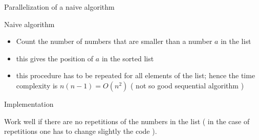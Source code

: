 \documentclass[compress,10pt,aspectratio=169]{beamer}
\begin{document}
\begin{frame}[fragile]{Parallelization of a naive algorithm}
  \scriptsize
  \begin{block}{Naive algorithm}
  \begin{itemize}
  \item Count the number of numbers that are smaller than a number $a$ in the list
  \item this gives the position of $a$ in the sorted list
  \item this procedure has to be repeated for all elements of the list; hence the
        time complexity is $n(n-1)=O(n^{2})$ ( not so good sequential algorithm )
  \end{itemize}
  \end{block}

  \begin{exampleblock}{Implementation}
    \begin{center}
    \end{center}
  \end{exampleblock}

  Work well if there are no repetitions of the numbers in the list ( in the case
  of repetitions one has to change slightly the code ).

\end{frame}
\end{document}
